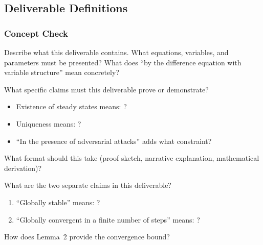 \begin{answerbox}\end{answerbox}

\subsection{Deliverable Definitions}

\subsubsection*{Concept Check}

Describe what this deliverable contains. What equations, variables, and parameters must be presented? What does ``by the difference equation with variable structure'' mean concretely?

\begin{answerbox}\end{answerbox}

What specific claims must this deliverable prove or demonstrate?
\begin{itemize}[nosep]
  \item Existence of steady states means: ?
  \item Uniqueness means: ?
  \item ``In the presence of adversarial attacks'' adds what constraint?
\end{itemize}
What format should this take (proof sketch, narrative explanation, mathematical derivation)?

\begin{answerbox}\end{answerbox}

What are the two separate claims in this deliverable?
\begin{enumerate}[nosep]
  \item ``Globally stable'' means: ?
  \item ``Globally convergent in a finite number of steps'' means: ?
\end{enumerate}
How does Lemma~2 provide the convergence bound?

\begin{answerbox}\end{answerbox}


